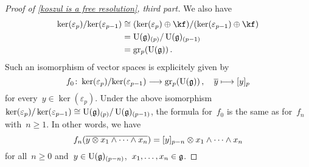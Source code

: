 \begin{proof}[Proof of \cref{koszul is a free resolution}, third part]
	We also have
	\begin{align*}
		\ker(\varepsilon_p)
		/
		{\ker(\varepsilon_{p-1})}
		&\cong
		(\ker(\varepsilon_p) \oplus \kf)
		/
		(\ker(\varepsilon_{p-1}) \oplus \kf)
		\\
		&=
		\Univ(\glie)_{(p)} / \Univ(\glie)_{(p-1)}
		\\
		&=
		\gr[p]( \Univ(\glie) ) \,.
	\end{align*}
	Such an isomorphism of vector spaces is explicitely given by
	\[
		f_0
		\colon
		\ker(\varepsilon_p) / {\ker(\varepsilon_{p-1})}
		\to
		\gr[p]( \Univ(\glie) ) \,,
		\quad
		\class{y}
		\mapsto
		\fclass{ y }_p
	\]
	for every~$y \in \ker(\varepsilon_p)$.
	Under the above isomorphism~$\ker(\varepsilon_p) / \ker(\varepsilon_{p-1}) \cong \operatorname{U}(\mathfrak{g})_{(p)} / \operatorname{U}(\mathfrak{g})_{(p-1)}$, the formula for~$f_0$ is the same as for~$f_n$ with~$n \geq 1$.
	In other words, we have
	\[
		f_n( \overline{ y \otimes x_1 \wedge \dotsb \wedge x_n } )
		=
		\lbrack y \rbrack_{p-n} \otimes x_1 \wedge \dotsb \wedge x_n
	\]
	for all~$n \geq 0$ and~$y \in \operatorname{U}(\mathfrak{g})_{(p-n)}$,~$x_1, \dotsc, x_n \in \mathfrak{g}$.


\end{proof}
